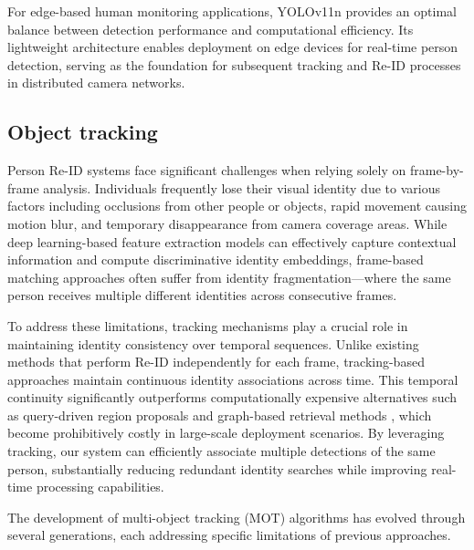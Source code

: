 \documentclass[../main.tex]{subfiles}
\begin{document}
For edge-based human monitoring applications, YOLOv11n provides an optimal balance between detection performance and computational efficiency. Its lightweight architecture enables deployment on edge devices for real-time person detection, serving as the foundation for subsequent tracking and Re-ID processes in distributed camera networks.

\subsection{Object tracking}
\label{sec:objtrack}

Person Re-ID systems face significant challenges when relying solely on frame-by-frame analysis. Individuals frequently lose their visual identity due to various factors including occlusions from other people or objects, rapid movement causing motion blur, and temporary disappearance from camera coverage areas. While deep learning-based feature extraction models can effectively capture contextual information and compute discriminative identity embeddings, frame-based matching approaches often suffer from identity fragmentation—where the same person receives multiple different identities across consecutive frames.

To address these limitations, tracking mechanisms play a crucial role in maintaining identity consistency over temporal sequences. Unlike existing methods that perform Re-ID independently for each frame, tracking-based approaches maintain continuous identity associations across time. This temporal continuity significantly outperforms computationally expensive alternatives such as query-driven region proposals \cite{munjal2019queryguidedendtoendpersonsearch} and graph-based retrieval methods \cite{zhu2025graphbasedapproachesfunctionalitiesretrievalaugmented}, which become prohibitively costly in large-scale deployment scenarios. By leveraging tracking, our system can efficiently associate multiple detections of the same person, substantially reducing redundant identity searches while improving real-time processing capabilities.

The development of multi-object tracking (MOT) algorithms has evolved through several generations, each addressing specific limitations of previous approaches. 
\end{document}
